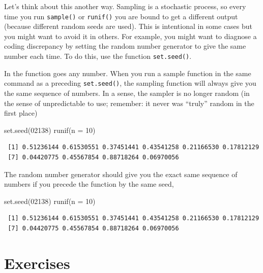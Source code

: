 \documentclass[
  letterpaper,
]{book}
\newenvironment{Shaded}{\begin{snugshade}}{\end{snugshade}}
\newcommand{\AttributeTok}[1]{\textcolor[rgb]{0.40,0.45,0.13}{#1}}
\newcommand{\DecValTok}[1]{\textcolor[rgb]{0.68,0.00,0.00}{#1}}
\newcommand{\FunctionTok}[1]{\textcolor[rgb]{0.28,0.35,0.67}{#1}}
\newcommand{\NormalTok}[1]{\textcolor[rgb]{0.00,0.23,0.31}{#1}}
\theoremstyle{definition}
\theoremstyle{definition}
\theoremstyle{plain}
\theoremstyle{definition}
\theoremstyle{plain}
\theoremstyle{plain}
\theoremstyle{remark}
\begin{document}
Let's think about this another way. Sampling is a stochastic process, so
every time you run \texttt{sample()} or \texttt{runif()} you are bound
to get a different output (because different random seeds are used).
This is intentional in some cases but you might want to avoid it in
others. For example, you might want to diagnose a coding discrepancy by
setting the random number generator to give the same number each time.
To do this, use the function \texttt{set.seed()}.

In the function goes any number. When you run a sample function in the
same command as a preceding \texttt{set.seed()}, the sampling function
will always give you the same sequence of numbers. In a sense, the
sampler is no longer random (in the sense of unpredictable to use;
remember: it never was ``truly'' random in the first place)

\begin{Shaded}
\begin{Highlighting}[]
\FunctionTok{set.seed}\NormalTok{(}\DecValTok{02138}\NormalTok{)}
\FunctionTok{runif}\NormalTok{(}\AttributeTok{n =} \DecValTok{10}\NormalTok{)}
\end{Highlighting}
\end{Shaded}

\begin{verbatim}
 [1] 0.51236144 0.61530551 0.37451441 0.43541258 0.21166530 0.17812129
 [7] 0.04420775 0.45567854 0.88718264 0.06970056
\end{verbatim}

The random number generator should give you the exact same sequence of
numbers if you precede the function by the same seed,

\begin{Shaded}
\begin{Highlighting}[]
\FunctionTok{set.seed}\NormalTok{(}\DecValTok{02138}\NormalTok{)}
\FunctionTok{runif}\NormalTok{(}\AttributeTok{n =} \DecValTok{10}\NormalTok{)}
\end{Highlighting}
\end{Shaded}

\begin{verbatim}
 [1] 0.51236144 0.61530551 0.37451441 0.43541258 0.21166530 0.17812129
 [7] 0.04420775 0.45567854 0.88718264 0.06970056
\end{verbatim}

\hypertarget{exercises-1}{%
\section*{Exercises}\label{exercises-1}}
\end{document}
